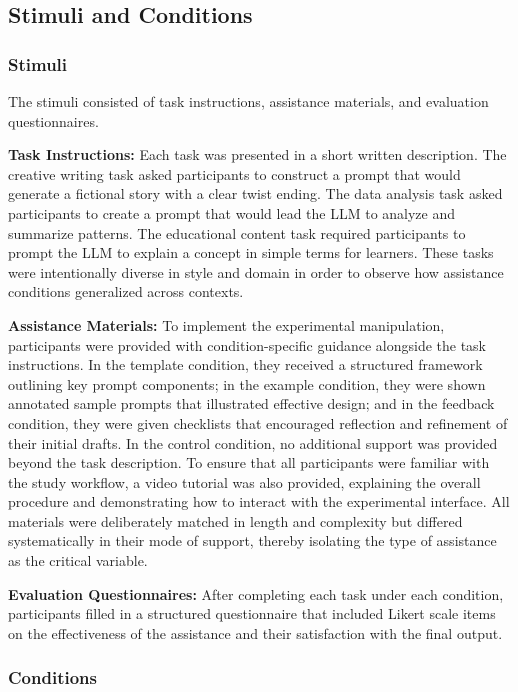 \subsection{\textbf{Stimuli and Conditions}}

\subsubsection{\textbf{Stimuli}}

The stimuli consisted of task instructions, assistance materials, and evaluation questionnaires.

\textbf{Task Instructions:} Each task was presented in a short written description. The creative writing task asked participants to construct a prompt that would generate a fictional story with a clear twist ending. The data analysis task asked participants to create a prompt that would lead the LLM to analyze and summarize patterns. The educational content task required participants to prompt the LLM to explain a concept in simple terms for learners. These tasks were intentionally diverse in style and domain in order to observe how assistance conditions generalized across contexts.

\textbf{Assistance Materials:} To implement the experimental manipulation, participants were provided with condition-specific guidance alongside the task instructions. In the template condition, they received a structured framework outlining key prompt components; in the example condition, they were shown annotated sample prompts that illustrated effective design; and in the feedback condition, they were given checklists that encouraged reflection and refinement of their initial drafts. In the control condition, no additional support was provided beyond the task description. To ensure that all participants were familiar with the study workflow, a video tutorial was also provided, explaining the overall procedure and demonstrating how to interact with the experimental interface. All materials were deliberately matched in length and complexity but differed systematically in their mode of support, thereby isolating the type of assistance as the critical variable.

\textbf{Evaluation Questionnaires:} After completing each task under each condition, participants filled in a structured questionnaire that included Likert scale items on the effectiveness of the assistance and their satisfaction with the final output.

\subsubsection{\textbf{Conditions}}

